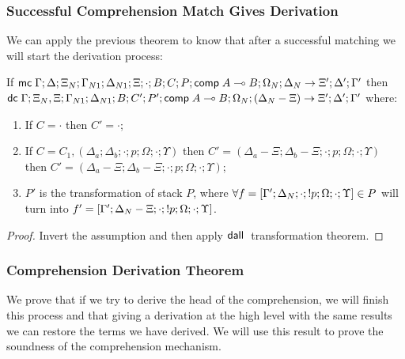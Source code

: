 \subsubsection{Successful Comprehension Match Gives Derivation}

We can apply the previous theorem to know that after a successful matching we will start the derivation process:

\begin{lemma}
   If $\mathsf{mc} \; \Gamma; \Delta; \Xi_N; \Gamma_{N1}; \Delta_{N1}; \Xi; \cdot; B; C; P; \mathsf{comp} \; A \multimap B;\Omega_N; \Delta_N \rightarrow \Xi'; \Delta'; \Gamma'$ then $\mathsf{dc} \; \Gamma; \Xi_N, \Xi; \Gamma_{N1}; \Delta_{N1}; B; C'; P'; \mathsf{comp} \; A \multimap B; \Omega_N; (\Delta_N - \Xi) \rightarrow \Xi'; \Delta'; \Gamma'$ where:
   
   \begin{enumerate}
      \item If $C = \cdot$ then $C' = \cdot$;
      \item If $C = C_1, (\Delta_a; \Delta_b; \cdot; p; \Omega; \cdot; \Upsilon)$ then $C' = (\Delta_a - \Xi; \Delta_b - \Xi; \cdot; p; \Omega; \cdot; \Upsilon)$ then $C' = (\Delta_a - \Xi; \Delta_b - \Xi; \cdot; p; \Omega; \cdot; \Upsilon)$;
      \item $P'$ is the transformation of stack $P$, where $\forall f = [\Gamma'; \Delta_N; \cdot; {!} p; \Omega; \cdot; \Upsilon] \in P$ will turn into $f' = [\Gamma'; \Delta_N - \Xi; \cdot; {!} p; \Omega; \cdot; \Upsilon]$.
   \end{enumerate}
\end{lemma}

\begin{proof}
   Invert the assumption and then apply $\mathsf{dall} \;$ transformation theorem.
\end{proof}

\subsubsection{Comprehension Derivation Theorem}

We prove that if we try to derive the head of the comprehension, we will finish this process and that giving a derivation at the high level with the same results we can restore the terms we have derived. We will use this result to prove the soundness of the comprehension mechanism.

